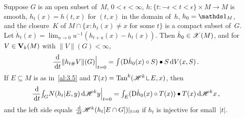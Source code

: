 \begin{lemma}
    \label{al:4.1}
    Suppose $G$ is an open subset of~$M$, $0 < \epsilon < \infty$, $h : \{ t : -\epsilon < t <
    \epsilon \} \times M \to M$ is smooth, $h_t(x) = h(t,x)$ for $(t,x)$ in the domain of~$h$,
    $h_0 = \id{M}$, and the closure~$K$ of $M \cap \{ x : h_t(x) \ne x \text{ for some } t \}$
    is a compact subset of~$G$. Let $\dot h_t(x) = \lim_{u \to 0} u^{-1}(h_{t+u}(x) - h_t(x))$.
    Then $\dot h_0 \in \mathscr{X}(M)$, and for $V \in \mathbf{V}_{k}(M)$ with $\|V\|(G) < \infty$,
    \begin{equation}
        \label{eq:4.1:1}
        \frac{\,\mathrm{d}}{\,\mathrm{d} t} \|h_{t \#} V\|(G) \Big|_{t=0} = {\textstyle\int_{}^{}} (\mathrm{D} \dot h_0(x) \circ S)
        \bullet S \,\mathrm{d} V(x,S) \,.
    \end{equation}
    If $E \subseteq M$ is as in~\ref{al:3.5} and $T(x) = \Tan^{\vdim}(\HM^{\vdim} \restrict E,
    x)$, then
    \begin{equation}
        \label{eq:4.1:2}
        \frac{\,\mathrm{d}}{\,\mathrm{d} t} {\textstyle\int_{G}^{}} N(h_t | E, y) \,\mathrm{d} \mathscr{H}^{k} y \Big|_{t=0} = {\textstyle\int_{E}^{}}
        (\mathrm{D} \dot h_0(x) \circ T(x)) \bullet T(x) \,\mathrm{d} \mathscr{H}^{k} x \,,
    \end{equation}
    and the left side equals $\frac{\,\mathrm{d}}{\,\mathrm{d} t} \mathscr{H}^{k}(h_t[E \cap G]) |_{t=0}$ if $h_t$ is
    injective for small~$|t|$.
\end{lemma}

